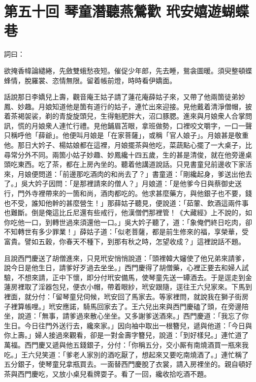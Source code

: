 
\chapter*{第五十回 琴童潛聽燕鶯歡 玳安嬉遊蝴蝶巷}


詞曰：

\begin{myquote} 
欲掩香幃論繾綣，先斂雙蛾愁夜短。催促少年郎，先去睡，鴛衾圖暖。須臾整頓蝶蜂情，脫羅裳、恣情無限。留着帳前燈，時時看伊嬌面。

\end{myquote} 

話說那日李嬌兒上壽，觀音庵王姑子請了蓮花庵薛姑子來，又帶了他兩箇徒弟妙鳳、妙趣。月娘知道他是箇有道行的姑子，連忙出來迎接。見他戴着清淨僧帽，披着茶褐袈裟，剃的青旋旋頭兒，生得魁肥胖大，沼口豚腮。進來與月娘衆人合掌問訊，慌的月娘衆人連忙行禮。見他鋪眉苫眼，拿班做勢，口裡咬文嚼字，一口一聲只稱呼他「薛爺」。他便叫月娘是「在家菩薩」，或稱「官人娘子」。月娘甚是敬重他。那日大妗子、楊姑娘都在這裡，月娘擺茶與他吃，菜蔬點心擺了一大桌子，比尋常分外不同。兩箇小姑子妙趣、妙鳳纔十四五歲，生的甚是清俊，就在他旁邊桌頭吃東西。吃了茶，都在上房內坐的。聽着他講道說話。只見書童兒前邊收下家活來，月娘便問道：「前邊那吃酒肉的和尚去了？」書童道：「剛纔起身，爹送出他去了。」吳大妗子因問：「是那裡請來的僧人？」月娘道：「是他爹今日與蔡御史送行，門外寺裡帶來的一箇和尚，酒肉都吃的。他求甚麼藥方，與他銀子也不要，錢也不受，誰知他幹的甚麼營生！」那薛姑子聽見，便說道：「茹葷、飲酒這兩件事也難斷。倒是俺這比丘尼還有些戒行，他漢僧們那裡管！《大藏經》上不說的，如你吃他一口，到轉世過來須還他一口。」吳大妗子聽了，道：「象俺們終日吃肉，卻不知轉世有多少罪業！」薛姑子道：「似老菩薩，都是前生修來的福，享榮華，受富貴。譬如五穀，你春天不種下，到那有秋之時，怎望收成？」這裡說話不題。

且說西門慶送了胡僧進來，只見玳安悄悄說道：「頭裡韓大嬸使了他兄弟來請爹，說今日是他生日，請爹好歹過去坐坐。」西門慶得了胡僧藥，心裡正要去和婦人試驗，不想來請，正中下懷，即分付玳安備馬，使琴童先送一罈酒去。于是逕走到金蓮房裡取了淫器包兒，便衣小帽，帶着眼紗，玳安跟隨，逕往王六兒家來。下馬到裡面，就分付：「留琴童兒伺候，玳安回了馬家去。等家裡問，就說我在獅子街房子裡算帳哩。」玳安應諾，騎馬回家去了。王六兒出來與西門慶磕了頭，在旁邊陪坐，說道：「無事，請爹過來散心坐坐。又多謝爹送酒來。」西門慶道：「我忘了你生日。今日往門外送行去，纔來家。」因向袖中取出一根簪兒，遞與他道：「今日與你上壽。」婦人接過來觀看，卻是一對金壽字簪兒，說道：「到好樣兒。」連忙道了萬福。西門慶又遞與他五錢銀子，分付：「你稱五分，交小厮有南燒酒買一瓶來我吃。」王六兒笑道：「爹老人家別的酒吃厭了，想起來又要吃南燒酒了。」連忙稱了五分銀子，使琴童兒拿瓶買去。一面替西門慶脫了衣裳，請入房裡坐的。親自頓好茶與西門慶吃，又放小桌兒看牌耍子。看了一回，纔收拾吃酒不題。

